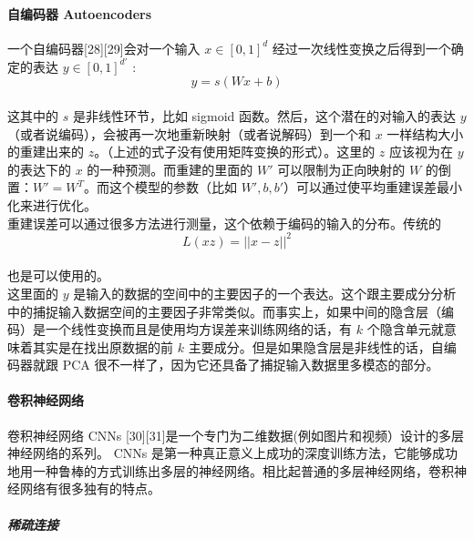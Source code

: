 \paragraph{自编码器
Autoencoders}\label{ux81eaux7f16ux7801ux5668-autoencoders}

一个自编码器{[}28{]}{[}29{]}会对一个输入 \(x∈[0, 1]^{d}\)
经过一次线性变换之后得到一个确定的表达 \(y∈[0,1]^{d′}\)
:\\\[y = s(Wx + b)\]\\这其中的 \(s\) 是非线性环节，比如 sigmoid
函数。然后，这个潜在的对输入的表达 \(y\)
（或者说编码），会被再一次地重新映射（或者说解码）到一个和 \(x\)
一样结构大小的重建出来的
\(z\)。（上述的式子没有使用矩阵变换的形式）。这里的 \(z\) 应该视为在
\(y\) 的表达下的 \(x\) 的一种预测。而重建的里面的 \(W'\)
可以限制为正向映射的 \(W\) 的倒置：\(W'=W^T\)。而这个模型的参数（比如
\(W',b,b'\)）可以通过使平均重建误差最小化来进行优化。\\重建误差可以通过很多方法进行测量，这个依赖于编码的输入的分布。传统的\\\[L(xz) = ||x-z||^2\]\\也是可以使用的。\\这里面的
\(y\)
是输入的数据的空间中的主要因子的一个表达。这个跟主要成分分析中的捕捉输入数据空间的主要因子非常类似。而事实上，如果中间的隐含层（编码）是一个线性变换而且是使用均方误差来训练网络的话，有
\(k\) 个隐含单元就意味着其实是在找出原数据的前 \(k\)
主要成分。但是如果隐含层是非线性的话，自编码器就跟 PCA
很不一样了，因为它还具备了捕捉输入数据里多模态的部分。

\paragraph{卷积神经网络}\label{ux5377ux79efux795eux7ecfux7f51ux7edc}

卷积神经网络 CNNs
{[}30{]}{[}31{]}是一个专门为二维数据(例如图片和视频）设计的多层神经网络的系列。
CNNs
是第一种真正意义上成功的深度训练方法，它能够成功地用一种鲁棒的方式训练出多层的神经网络。相比起普通的多层神经网络，卷积神经网络有很多独有的特点。

\subparagraph{稀疏连接}\label{ux7a00ux758fux8fdeux63a5}

